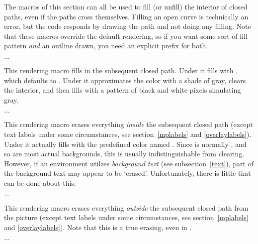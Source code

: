 \documentclass[letterpaper]{article}
\begin{document}
The macros of this section can all be used to fill (or unfill) the
interior of closed paths, even if the paths cross themselves. Filling an
open curve is technically an error, but the \MF{} code responds by
drawing the path and not doing any filling. Note that these macros
override the default rendering, so if you want some sort of fill pattern
\emph{and} an outline drawn, you need an explicit prefix for both.

\begin{cd}
$\ldots$%
\end{cd}

This rendering macro fills in the subsequent closed path. Under \MP{} it
fills with , which defaults to
. Under \MF{} it
approximates the color with a shade of gray, clears the interior, and
then fills with a pattern of black and white pixels simulating gray.

\begin{cd}
$\ldots$%
\end{cd}

This rendering macro erases everything \emph{inside} the subsequent
closed path (except text labels under some circumstances, see
section~\ref{mplabels} and \ref{overlaylabels}). Under \MP{} it actually
fills with the predefined color named . Since
 is normally , and so are most actual
backgrounds, this is usually indistinguishable from clearing. However,
if an  environment utilzes \emph{background text} (see
subsection~\ref{text}), part of the background text may appear to be
`erased'. Unfortunately, there is little that can be done about this.

\begin{cd}
$\ldots$%
\end{cd}

This rendering macro erases everything \emph{outside} the subsequent
closed path from the picture (except text labels under some
circumstances, see section~\ref{mplabels} and \ref{overlaylabels}). Note
that this is a true erasing, even in \MP{}.

\begin{cd}
$\ldots$%
\end{cd}
\end{document}
